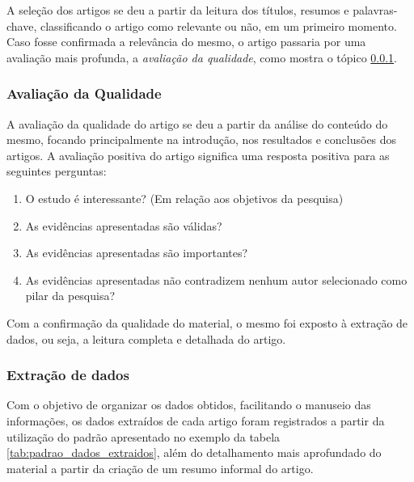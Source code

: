 			A seleção dos artigos se deu a partir da leitura dos títulos, resumos e palavras-chave, classificando o artigo como relevante ou não, em um primeiro momento. Caso fosse confirmada a relevância do mesmo, o artigo passaria por uma avaliação mais profunda, a \textit{avaliação da qualidade}, como mostra o tópico \ref{sub:avaliacao_qualidade}.


		\subsubsection{Avaliação da Qualidade}
		\label{sub:avaliacao_qualidade}

			A avaliação da qualidade do artigo se deu a partir da análise do conteúdo do mesmo, focando principalmente na introdução, nos resultados e conclusões dos artigos. A avaliação positiva do artigo significa uma resposta positiva para as seguintes perguntas:

			\begin{enumerate}
				\item O estudo é interessante? (Em relação aos objetivos da pesquisa)
				\item As evidências apresentadas são válidas?
				\item As evidências apresentadas são importantes?
				\item As evidências apresentadas não contradizem nenhum autor selecionado como pilar da pesquisa?
			\end{enumerate}

			Com a confirmação da qualidade do material, o mesmo foi exposto à extração de dados, ou seja, a leitura completa e detalhada do artigo.

		\subsubsection{Extração de dados}

			Com o objetivo de organizar os dados obtidos, facilitando o manuseio das informações, os dados extraídos de cada artigo foram registrados a partir da utilização do padrão apresentado no exemplo da tabela \ref{tab:padrao_dados_extraidos}, além do detalhamento mais aprofundado do material a partir da criação de um resumo informal do artigo.

